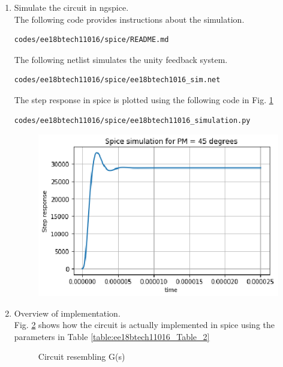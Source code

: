 \begin{enumerate}[label=\arabic*.,ref=\theenumi]
\item Simulate the circuit in ngspice.\\
\solution The following code provides instructions about the simulation.
\begin{lstlisting}
codes/ee18btech11016/spice/README.md
\end{lstlisting}


The following netlist simulates the unity feedback system. 
\\

\begin{lstlisting}
codes/ee18btech11016/spice/ee18btech1016_sim.net
\end{lstlisting}
 The step response in spice is plotted using the following code in Fig. \ref{fig:ee18btech11016_spice}
 \begin{lstlisting}
codes/ee18btech11016/spice/ee18btech11016_simulation.py
\end{lstlisting}
\begin{figure}[!h]
\centering
\includegraphics[width=\columnwidth]{./figs/ee18btech11016/ee18btech11016_spice.eps}
\caption{}
\label{fig:ee18btech11016_spice}
\end{figure}

\item Overview of implementation.\\
\solution Fig. \ref{fig:ee18btech110016_circuit_1} shows how the circuit is actually implemented in spice using the parameters in Table \ref{table:ee18btech11016_Table_2}  

\begin{figure}[!ht]
	\begin{center}
				\resizebox{\columnwidth}{!}{}
	\end{center}
\caption{Circuit resembling G(s)}
\label{fig:ee18btech110016_circuit_1}
\end{figure}

\begin{table}[!ht]
\centering

\caption{}
\label{table:ee18btech11016_Table_2}
\end{table}

\end{enumerate}
